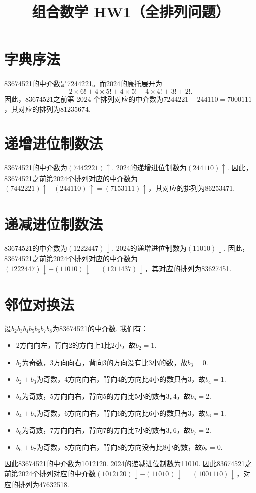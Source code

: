 \documentclass{article}
\title{组合数学 HW1（全排列问题）}
\begin{document}
\maketitle

\section{字典序法}
83674521的中介数是7244221。而2024的康托展开为
\[2\times 6!+4\times 5!+4\times 5!+4\times 4! +3!+2!.\]
因此，83674521之前第 2024 个排列对应的中介数为$7244221-244110=7000111$，其对应的排列为81235674.


\section{递增进位制数法}
83674521的中介数为$(7442221)\uparrow$. 2024的递增进位制数为$(244110)\uparrow$. 因此，83674521之前第2024个排列对应的中介数为$(7442221)\uparrow-(244110)\uparrow=(7153111)\uparrow$，其对应的排列为86253471.


\section{递减进位制数法}
83674521的中介数为$(1222447)\downarrow$. 2024的递增进位制数为$(11010)\downarrow$. 因此，83674521之前第2024个排列对应的中介数为$(1222447)\downarrow-(11010)\downarrow=(1211437)\downarrow$，其对应的排列为83627451.

\section{邻位对换法}
设$b_2b_3b_4b_5b_6b_7b_8$为83674521的中介数. 我们有：
\begin{itemize}
    \item 2方向向左，背向2的方向上1比2小，故$b_2=1$.

    \item $b_2$为奇数，3方向向右，背向3的方向没有比3小的数，故$b_3=0$.

    \item $b_2+b_3$为奇数，4方向向右，背向4的方向比4小的数只有3，故$b_4=1$.

    \item $b_4$为奇数，5方向向右，背向5的方向比5小的数有$3,4$，故$b_5=2$.

    \item $b_4+b_5$为奇数，6方向向右，背向6的方向比6小的数只有3，故$b_6=1$.

    \item $b_6$为奇数，7方向向右，背向7的方向比7小的数有$3,6$，故$b_7=2$.

    \item $b_6+b_7$为奇数，8方向向右，背向8的方向没有比8小的数，故$b_8=0$.
\end{itemize}
因此83674521的中介数为1012120. 2024的递减进位制数为11010. 因此83674521之前第2024个排列对应的中介数$(1012120)\downarrow-(11010)\downarrow=(1001110)\downarrow$，对应的排列为47632518.
\end{document}
